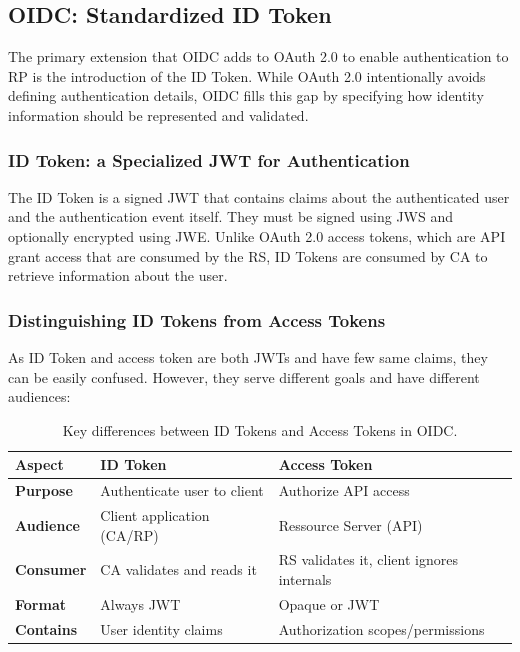 \documentclass[../memoire.tex]{subfiles}
\begin{document}
\subsection{OIDC: Standardized ID Token}

The primary extension that OIDC adds to OAuth 2.0 to enable authentication to RP is the introduction of the ID Token\cite{oidc_core}\cite[p.~105]{wilson2022}\cite[p.~134]{siri2020}. While OAuth 2.0 intentionally avoids defining authentication details, OIDC fills this gap by specifying how identity information should be represented and validated.


\subsubsection*{ID Token: a Specialized JWT for Authentication}
The ID Token is a signed JWT that contains claims about the authenticated user and the authentication event itself\cite[p.~105]{wilson2022}\cite[p.~134]{siri2020}. They must be signed using JWS and optionally encrypted using JWE\cite{oidc_core}. Unlike OAuth 2.0 access tokens, which are API grant access that are consumed by the RS, ID Tokens are consumed by CA to retrieve information about the user.

\subsubsection*{Distinguishing ID Tokens from Access Tokens}

As ID Token and access token are both JWTs and have few same claims, they can be easily confused. However, they serve different goals and have different audiences:

\begin{table}[htbp]
\centering
\small
\renewcommand{\arraystretch}{1.6}
\begin{tabularx}{\textwidth}{ 
   >{\raggedright\arraybackslash}X 
   >{\raggedright\arraybackslash}X 
   >{\raggedright\arraybackslash}X  
}
        \hline
        \textbf{Aspect} & \textbf{ID Token} & \textbf{Access Token}  \\ \hline
        \textbf{Purpose} & Authenticate user to client & Authorize API access \\ \hline

        \textbf{Audience} & Client application (CA/RP) & Ressource Server (API) \\ \hline
        \textbf{Consumer} & CA validates and reads it & RS validates it, client ignores internals \\ \hline
        \textbf{Format} & Always JWT & Opaque or JWT \\ \hline
        \textbf{Contains} & User identity claims & Authorization scopes/permissions \\ \hline
\end{tabularx}
\caption{Key differences between ID Tokens and Access Tokens in OIDC.}
\label{tab:id_oauth_diff}
\end{table}
\end{document}
